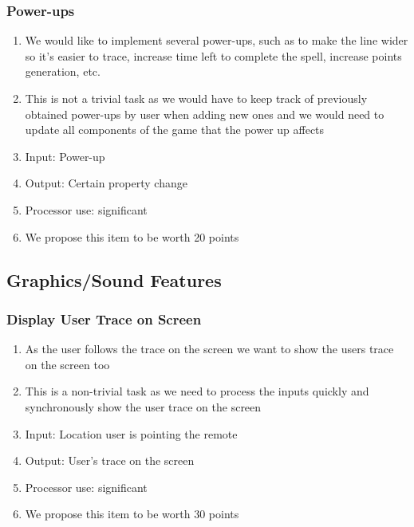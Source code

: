 \documentclass[letterpaper]{article} %
\begin{document}
\subsubsection{Power-ups}
    \begin{enumerate}
        \item We would like to implement several power-ups, such as to make the line wider so it's easier to trace, increase time left to complete the spell, increase points generation, etc.
        \item This is not a trivial task as we would have to keep track of previously obtained power-ups by user when adding new ones and we would need to update all components of the game that the power up affects
        \item Input: Power-up
        \item Output: Certain property change
        \item Processor use: significant
        \item We propose this item to be worth 20 points
    \end{enumerate}

\subsection{Graphics/Sound Features}
\subsubsection{Display User Trace on Screen}
    \begin{enumerate}
        \item As the user follows the trace on the screen we want to show the users trace on the screen too
        \item This is a non-trivial task as we need to process the inputs quickly and synchronously show the user trace on the screen
        \item Input: Location user is pointing the remote
        \item Output: User's trace on the screen
        \item Processor use: significant
        \item We propose this item to be worth 30 points
    \end{enumerate}
\end{document}
